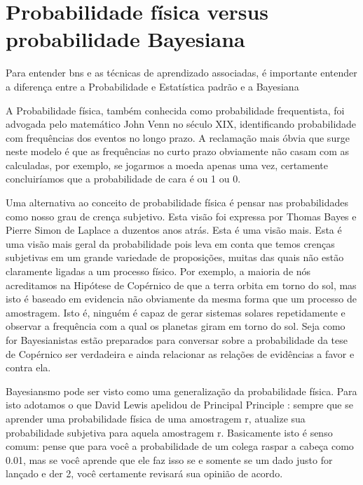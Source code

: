 \section{Probabilidade física versus probabilidade Bayesiana}
Para entender \glspl{bn} e as técnicas de aprendizado associadas, é importante entender a diferença entre a Probabilidade e Estatística padrão e a Bayesiana \cite{korb04}


A Probabilidade física, também conhecida como probabilidade frequentista, foi advogada pelo matemático John Venn \cite{venn66} no século XIX, identificando probabilidade com frequências dos eventos no longo prazo. A reclamação mais óbvia que surge neste modelo é que as frequências no curto prazo obviamente não casam com as calculadas, por exemplo, se jogarmos a moeda apenas uma vez, certamente concluiríamos que a probabilidade de cara é ou 1 ou 0.

Uma alternativa ao conceito de probabilidade física é pensar nas probabilidades como nosso grau de crença subjetivo. Esta visão foi expressa por Thomas Bayes \cite{bayes63} e Pierre Simon de Laplace \cite{laplace12} a duzentos anos atrás. Esta é uma visão mais. Esta é uma visão mais geral da probabilidade pois leva em conta que temos crenças subjetivas em um grande variedade de proposições, muitas das quais não estão claramente ligadas a um processo físico.  Por exemplo, a maioria de nós acreditamos na Hipótese de Copérnico de que a terra orbita em torno do sol, mas isto é baseado em evidencia não obviamente da mesma forma que um processo de amostragem. Isto é, ninguém é capaz de gerar sistemas solares repetidamente e observar a frequência com a qual os planetas giram em torno do sol. Seja como for Bayesianistas estão preparados para conversar sobre a probabilidade da tese de Copérnico ser verdadeira e ainda relacionar as relações de evidências a favor e contra ela. 

Bayesiansmo pode ser visto como uma generalização da probabilidade física. Para isto adotamos o que David Lewis apelidou de Principal Principle \cite{lewis80}: sempre que se aprender uma probabilidade física de uma amostragem r, atualize sua probabilidade subjetiva para aquela amostragem r. Basicamente isto é senso comum: pense que para você a  probabilidade de um colega raspar a cabeça como 0.01, mas se você aprende que ele faz isso se e somente se um dado justo for lançado e der 2, você certamente revisará sua opinião de acordo.

